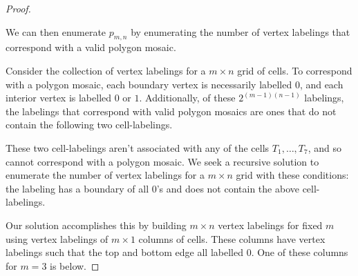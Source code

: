 \documentclass[12pt]{article}
\theoremstyle{plain}
\theoremstyle{definition}
\theoremstyle{remark}
\theoremstyle{definition}
\newcommand{\cell}[4]{ \draw[thick] ( #1 , #2 ) rectangle ( #3 , #4 );}
\newcommand{\lablvertex}[3]{\node[shape=circle,draw=none,fill=white, inner sep=2pt,minimum size=5pt] (A) at ( #1 , #2 ) {#3};}
\begin{document}
\begin{proof}
\begin{center}
\end{center}

We can then enumerate $p_{m,n}$ by enumerating the number of vertex labelings that correspond with a valid polygon mosaic. 

Consider the collection of vertex labelings for a $m \times n$ grid of cells. To correspond with a polygon mosaic, each boundary vertex is necessarily labelled $0$, and each interior vertex is labelled $0$ or $1$. Additionally, of these $2^{(m-1)(n-1)}$ labelings, the labelings that correspond with valid polygon mosaics are ones that do not contain the following two cell-labelings.

\begin{center}
\end{center}

These two cell-labelings aren't associated with any of the cells $T_1, \dots, T_7$, and so cannot correspond with a polygon mosaic. We seek a recursive solution to enumerate the number of vertex labelings for a $m \times n$ grid with these  conditions: the labeling has a boundary of all $0$'s and does not contain the above cell-labelings. 

Our solution accomplishes this by building $m \times n$ vertex labelings for fixed $m$ using vertex labelings of $m \times 1$ columns of cells. These columns have vertex labelings such that the top and bottom edge all labelled $0$. One of these columns for $m=3$ is below.


\end{proof}
\end{document}

